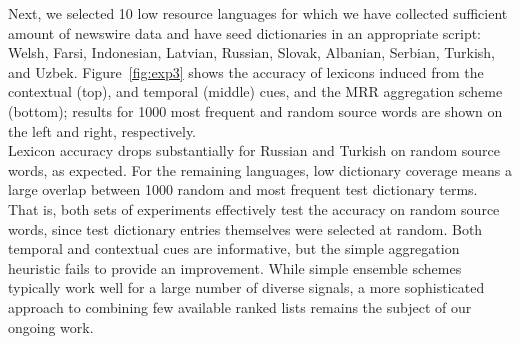\documentclass{article}
\newcommand{\mnote}[1]{\marginpar{%
  \vskip-\baselineskip
  \raggedright\footnotesize
  \itshape\hrule\smallskip\tiny{#1}\par\smallskip\hrule}}
\newcommand{\mtodo}[1]{\mnote{\textcolor{red}{#1}}}
\newcommand{\figref}[1]{Figure~\ref{#1}}
\begin{document}
Next, we selected 10 low resource languages for which we have collected sufficient amount of newswire data and have seed dictionaries in an appropriate script: Welsh, Farsi, Indonesian, Latvian, Russian, Slovak, Albanian, Serbian, Turkish, and Uzbek.  \figref{fig:exp3} shows the accuracy of lexicons induced from the contextual (top), and temporal (middle) cues, and the MRR aggregation scheme (bottom); results for 1000 most frequent and random source words are shown on the left and right, respectively.\\

Lexicon accuracy drops substantially for Russian and Turkish on random source words, as expected.  For the remaining languages, low dictionary coverage means a large overlap between 1000 random and most frequent test dictionary terms.  That is, both sets of experiments effectively test the accuracy on random source words, since test dictionary entries themselves were selected at random. \mtodo{Confusing? Drop most frequent?}  Both temporal and contextual cues are informative, but the simple aggregation heuristic fails to provide an improvement.  While simple ensemble schemes typically work well for a large number of diverse signals, a more sophisticated approach to combining few available ranked lists remains the subject of our ongoing work.\\
\end{document}

